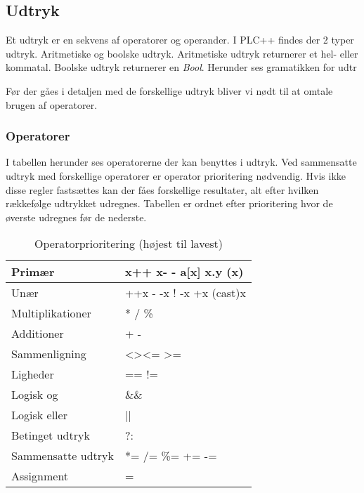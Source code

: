 \subsection{Udtryk}
Et udtryk er en sekvens af operatorer og operander. I PLC++ findes der 2 typer udtryk. Aritmetiske og boolske udtryk. Aritmetiske udtryk returnerer et hel- eller kommatal. Boolske udtryk returnerer en \textit{Bool}. Herunder ses gramatikken for udtr




Før der gåes i detaljen med de forskellige udtryk bliver vi nødt til at omtale brugen af operatorer.

\subsubsection{Operatorer}
I tabellen herunder ses operatorerne der kan benyttes i udtryk. Ved sammensatte udtryk med forskellige operatorer er operator prioritering nødvendig. Hvis ikke disse regler fastsættes kan der fåes forskellige resultater, alt efter hvilken rækkefølge udtrykket udregnes. Tabellen er ordnet efter prioritering hvor de øverste udregnes før de nederste.

\begin{table}[H]
    \centering
    \begin{tabular}{|l|l|}
        \hline
        \centering

        Primær             & x++ \quad x- - \quad a{[}x{]} \quad x.y \quad (x)                 \\ \hline
        Unær               & ++x \quad - -x \quad ! \quad -x \quad +x \quad (cast)x       \\ \hline
        Multiplikationer   & * \quad / \quad \%                                               \\ \hline
        Additioner         & + \quad -                                                        \\ \hline
        Sammenligning      & \textless \quad \textgreater \quad \textless= \quad\textgreater= \\ \hline
        Ligheder           & == \quad !=                                                      \\ \hline
        Logisk og          & \&\&                                                              \\ \hline
        Logisk eller       & ||                                                               \\ \hline
        Betinget udtryk    & ?:                                                               \\ \hline
        Sammensatte udtryk & *= \quad /= \quad \%= \quad += \quad -=                          \\ \hline
        Assignment         & =                                                                \\ \hline

    \end{tabular}
    \caption{Operatorprioritering (højest til lavest)}
    \label{tab:operatorprioritering}
\end{table}


